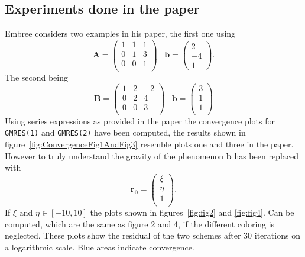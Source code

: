 \subsection{Experiments done in the paper}
Embree considers two examples in his paper, the first one using
\begin{equation}
\mathbf{A} = \begin{pmatrix}
1 & 1 & 1 \\
0 & 1 & 3 \\
0 & 0 & 1 \\
\end{pmatrix}
\;\;\; 
\mathbf{b} = \begin{pmatrix}
2 \\ -4 \\ 1
\end{pmatrix}.
\end{equation}
The second being
\begin{equation}
\mathbf{B} =
\begin{pmatrix}
1 & 2 & -2 \\
0 & 2 & 4 \\
0 & 0 & 3 \\
\end{pmatrix}
\;\;\;
\mathbf{b} =
\begin{pmatrix}
3 \\
1 \\
1 \\
\end{pmatrix}
\end{equation}
Using series expressions as provided in the paper the convergence plots for \texttt{GMRES(1)} and \texttt{GMRES(2)} have been computed, the results shown in figure~\ref{fig:ConvergenceFig1AndFig3} resemble plots one and three in the paper. However to truly understand the gravity of the phenomenon $\mathbf{b}$ has been replaced with 
\begin{equation}
\mathbf{r_0} = \begin{pmatrix}
\xi \\ \eta \\ 1 \\
\end{pmatrix}.
\end{equation}
If $\xi \text{ and } \eta \in [-10,10]$ the plots shown in figures~\ref{fig:fig2} and \ref{fig:fig4}. Can be computed, which are the same as figure 2 and 4, if the different coloring is neglected. These plots show the residual of the two schemes after 30 iterations on a logarithmic scale. Blue areas indicate convergence. 

